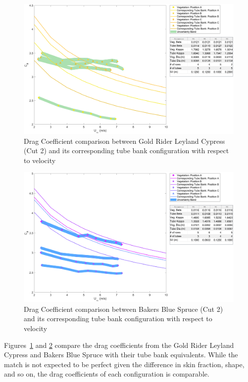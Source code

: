 \documentclass[12pt]{article}
\begin{document}
\begin{figure}[!]
	\centering 	
\includegraphics[width=\textwidth,keepaspectratio]{Picture13.pdf}
	\caption{Drag Coefficient comparison between Gold Rider Leyland Cypress (Cut 2) and its corresponding tube bank configuration with respect to velocity}
	\label{fig:TBGR}
\end{figure}

\begin{figure}[!]
	\centering 	
\includegraphics[width=\textwidth,keepaspectratio]{Picture14.pdf}
	\caption{Drag Coefficient comparison between Bakers Blue Spruce (Cut 2) and its corresponding tube bank configuration with respect to velocity}
	\label{fig:TBBB}
\end{figure}

Figures~\ref{fig:TBGR} and \ref{fig:TBBB} compare the drag coefficients from the Gold Rider Leyland Cypress and Bakers Blue Spruce with their tube bank equivalents. While the match is not expected to be perfect given the difference in skin fraction, shape, and so on, the drag coefficients of each configuration is comparable. 
\end{document}
